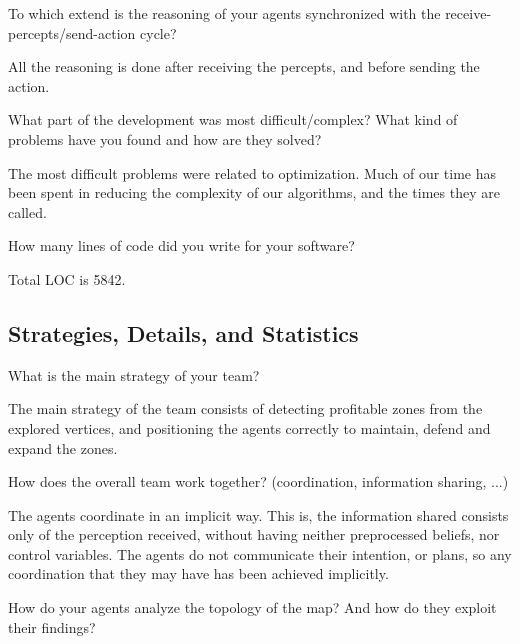 \begin{question}
To which extend is the reasoning of your agents synchronized with the
receive-percepts/send-action cycle?
\end{question}

All the reasoning is done after receiving the percepts, and before sending the
action.


\begin{question}
What part of the development was most difficult/complex? What kind of
problems have you found and how are they solved?  
\end{question}

The most difficult problems
were related to optimization. Much of our time has been spent in reducing the
complexity of our algorithms, and the times they are called.

\begin{question}
How many lines of code did you write for your software?  
\end{question}

Total LOC is 5842.

\subsection{Strategies, Details, and Statistics}
\setcounter{question}{0}
\begin{question}
What is the main strategy of your team?
\end{question}

The main strategy of the team consists of detecting profitable zones
from the explored vertices, and positioning the agents correctly to maintain,
defend and expand the zones.

\begin{question}
How does the overall team work together? (coordination, information
sharing, ...) 
\end{question}

The agents coordinate in an implicit way. This is, the  information shared 
consists only of the perception received, without having neither 
preprocessed beliefs, nor control variables. The agents do not communicate
their intention, or plans, so any coordination that they may have has been
achieved implicitly.

\begin{question}
How do your agents analyze the topology of the map? And how do they exploit
their findings? 
\end{question}

